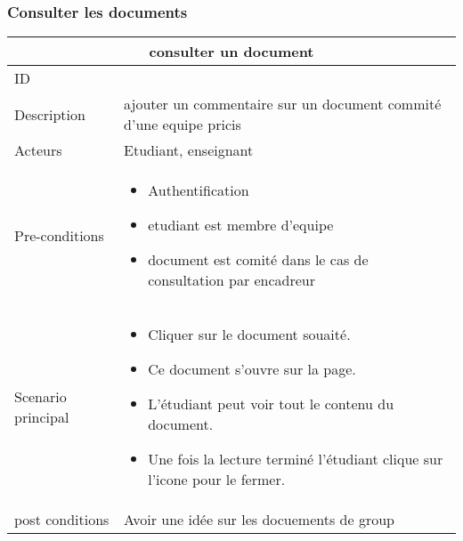 \documentclass[11pt,fleqn]{book} %
\begin{document}
\subsubsection{Consulter les documents}
\begin{center}
\begin{tabularx}{1\textwidth} { | p{4cm} | >{\raggedright\arraybackslash}X |  }
  \hline
  \multicolumn{2}{|c|}{consulter un document} \\
 \hline
 ID & 5  \\
 \hline
 Description  &  ajouter un commentaire sur un document commité d'une equipe pricis  \\
  \hline
 Acteurs  & Etudiant, enseignant   \\
  \hline
 Pre-conditions  & \begin{itemize}
     \item Authentification
     \item etudiant est membre d'equipe
     \item document est comité dans le cas de consultation par encadreur
 \end{itemize}\\
 \hline
 Scenario principal  &  
\begin{itemize}
     \item Cliquer sur le document souaité.
     \item Ce document s’ouvre sur la page.
     \item L’étudiant peut voir tout le contenu du document.
     \item Une fois la lecture terminé l’étudiant clique sur l’icone pour le fermer.

 \end{itemize}\\
  \hline
 post conditions  &  Avoir une idée sur les docuements de group  \\
  \hline
\end{tabularx}
\label{tbl:nicetablelesstable}
\end{center}
\end{document}
